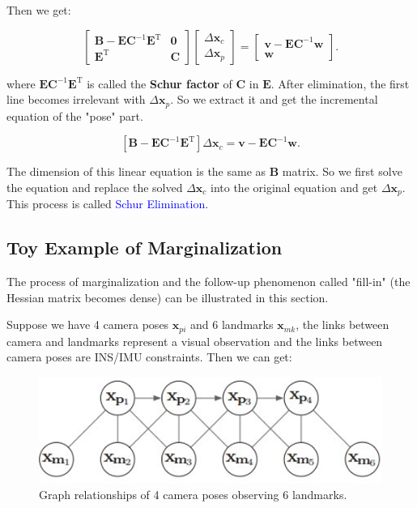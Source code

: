 \documentclass[12pt]{report}   %
\begin{document}
Then we get:

\begin{equation}
\left[ \begin{matrix}
\bm{B} - \bm{E}\bm{C}^{-1}\bm{E}^\mathrm{T}	& 	\bm{0} \\
\bm{E}^\mathrm{T}							& 	\bm{C}
\end{matrix} \right]
\left[ \begin{array}{l}
\Delta \bm{x}_c \\
\Delta \bm{x}_p 
\end{array} \right] = 
\left[\begin{array}{l}
\bm{v} - \bm{E}\bm{C}^{-1}\bm{w}  \\
\bm{w}
\end{array}\right].
\label{mid_schur}
\end{equation}

where $\bm{E}\bm{C}^{-1}\bm{E}^\mathrm{T}$ is called the \textbf{Schur factor} of $\bm{C}$ in $\bm{E}$. After elimination, the first line becomes irrelevant with $\Delta \bm{x}_p$. So we extract it and get the incremental equation of the "pose" part.

\begin{equation}
\left[ 
\bm{B} - \bm{E}\bm{C}^{-1}\bm{E}^\mathrm{T}
\right]
\Delta \bm{x}_c  = 
\bm{v} - \bm{E}\bm{C}^{-1}\bm{w}.
\label{eq:marginalization}
\end{equation}

The dimension of this linear equation is the same as $\bm{B}$ matrix. So we first solve the equation and replace the solved $\Delta \bm{x}_c$ into the original equation and get $\Delta \bm{x}_p$. This process is called \textcolor{blue}{Schur Elimination}. 


\subsection{Toy Example of Marginalization}

The process of marginalization and the follow-up phenomenon called "fill-in" (the Hessian matrix becomes dense) can be illustrated in this section. 

Suppose we have 4 camera poses $\bm{x}_{pi}$ and 6 landmarks $\bm{x}_{mk}$, the links between camera and landmarks represent a visual observation and the links between camera poses are INS/IMU constraints. Then we can get:


\begin{figure}[H]
	\centering
	\includegraphics[width=.6\linewidth]{figures/before_marg.png}
	\caption{Graph relationships of 4 camera poses observing 6 landmarks.}
	\label{fig:before_marg}
\end{figure}
\end{document}
